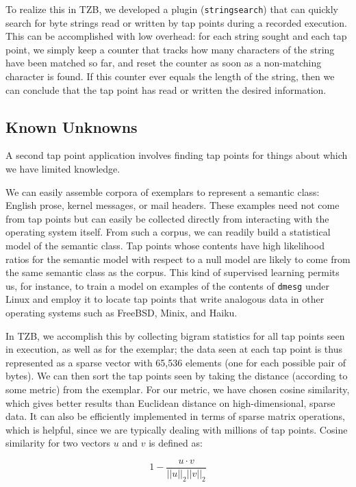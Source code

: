 To realize this in TZB, we developed a plugin (\texttt{stringsearch})
that can quickly search for byte strings read or written by tap points
during a recorded execution. This can be accomplished with low overhead:
for each string sought and each tap point, we simply keep a counter that
tracks how many characters of the string have been matched so far, and
reset the counter as soon as a non-matching character is found. If this
counter ever equals the length of the string, then we can conclude that
the tap point has read or written the desired information.

\subsection{Known Unknowns}

A second tap point application involves finding tap points for things
about which we have limited knowledge.

We can easily assemble corpora of exemplars to represent a semantic
class: English prose, kernel messages, or mail headers. These examples
need not come from tap points but can easily be collected directly from
interacting with the operating system itself. From such a corpus, we can
readily build a statistical model of the semantic class. Tap points
whose contents have high likelihood ratios for the semantic model with
respect to a null model are likely to come from the same semantic class
as the corpus. This kind of supervised learning permits us, for
instance, to train a model on examples of the contents of \texttt{dmesg}
under Linux and employ it to locate tap points that write analogous data
in other operating systems such as FreeBSD, Minix, and Haiku.

In TZB, we accomplish this by collecting bigram statistics for all tap
points seen in execution, as well as for the exemplar; the data seen at
each tap point is thus represented as a sparse vector with 65,536
elements (one for each possible pair of bytes). We can then sort the tap
points seen by taking the distance (according to some metric) from the
exemplar. For our metric, we have chosen cosine similarity, which gives
better results than Euclidean distance on high-dimensional, sparse data.
It can also be efficiently implemented in terms of sparse matrix
operations, which is helpful, since we are typically dealing with
millions of tap points. Cosine similarity for two vectors $u$ and $v$ is
defined as:

\[
1 - \frac{u \cdot v}{||u||_2 ||v||_2}
\]


